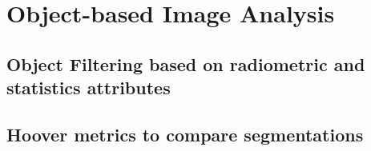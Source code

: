 
\chapter{Object-based Image Analysis }\label{sec:OBIA}

\section{Object Filtering based on radiometric and statistics attributes}


\section{Hoover metrics to compare segmentations}


%

